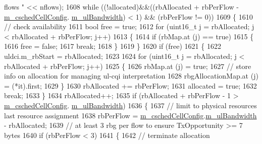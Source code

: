 \begin{DoxyCode}
{       flows "} << nflows);
1608       \textcolor{keywordflow}{while} ((!allocated)&&((rbAllocated + rbPerFlow - \hyperlink{classns3_1_1TtaFfMacScheduler_af263a06ea69ff1d096ddb48df0ac7f81}{m\_cschedCellConfig}.
      \hyperlink{structns3_1_1FfMacCschedSapProvider_1_1CschedCellConfigReqParameters_a5ab5b102878e6e7e7727a14af4a64d2f}{m\_ulBandwidth}) < 1) && (rbPerFlow != 0))
1609         \{
1610           \textcolor{comment}{// check availability}
1611           \textcolor{keywordtype}{bool} free = \textcolor{keyword}{true};
1612           \textcolor{keywordflow}{for} (uint16\_t j = rbAllocated; j < rbAllocated + rbPerFlow; j++)
1613             \{
1614               \textcolor{keywordflow}{if} (rbMap.at (j) == \textcolor{keyword}{true})
1615                 \{
1616                   free = \textcolor{keyword}{false};
1617                   \textcolor{keywordflow}{break};
1618                 \}
1619             \}
1620           \textcolor{keywordflow}{if} (free)
1621             \{
1622               uldci.m\_rbStart = rbAllocated;
1623 
1624               \textcolor{keywordflow}{for} (uint16\_t j = rbAllocated; j < rbAllocated + rbPerFlow; j++)
1625                 \{
1626                   rbMap.at (j) = \textcolor{keyword}{true};
1627                   \textcolor{comment}{// store info on allocation for managing ul-cqi interpretation}
1628                   rbgAllocationMap.at (j) = (*it).first;
1629                 \}
1630               rbAllocated += rbPerFlow;
1631               allocated = \textcolor{keyword}{true};
1632               \textcolor{keywordflow}{break};
1633             \}
1634           rbAllocated++;
1635           \textcolor{keywordflow}{if} (rbAllocated + rbPerFlow - 1 > \hyperlink{classns3_1_1TtaFfMacScheduler_af263a06ea69ff1d096ddb48df0ac7f81}{m\_cschedCellConfig}.
      \hyperlink{structns3_1_1FfMacCschedSapProvider_1_1CschedCellConfigReqParameters_a5ab5b102878e6e7e7727a14af4a64d2f}{m\_ulBandwidth})
1636             \{
1637               \textcolor{comment}{// limit to physical resources last resource assignment}
1638               rbPerFlow = \hyperlink{classns3_1_1TtaFfMacScheduler_af263a06ea69ff1d096ddb48df0ac7f81}{m\_cschedCellConfig}.\hyperlink{structns3_1_1FfMacCschedSapProvider_1_1CschedCellConfigReqParameters_a5ab5b102878e6e7e7727a14af4a64d2f}{m\_ulBandwidth} - rbAllocated;
1639               \textcolor{comment}{// at least 3 rbg per flow to ensure TxOpportunity >= 7 bytes}
1640               \textcolor{keywordflow}{if} (rbPerFlow < 3)
1641                 \{
1642                   \textcolor{comment}{// terminate allocation}

\end{DoxyCode}

